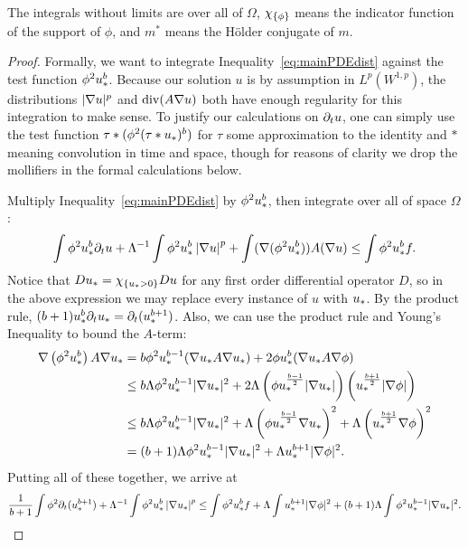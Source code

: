 \begin{lemma}
The integrals without limits are over all of $\Omega$, $\chi_{\{\phi\}}$ means the indicator function of the support of $\phi$, and $m^\ast$ means the H\"{o}lder conjugate of $m$.
\end{lemma}

\begin{proof}
Formally, we want to integrate Inequality~\eqref{eq:mainPDEdist} against the test function $\phi^2 u_*^b$.  Because our solution $u$ is by assumption in $L^p(W^{1,p})$, the distributions $|\nabla u|^p$ and $\operatorname{div}(A \nabla u)$ both have enough regularity for this integration to make sense.  To justify our calculations on $\partial_t u$, one can simply use the test function $\tau \ast (\phi^2 (\tau \ast u_*)^b)$ for $\tau$ some approximation to the identity and $\ast$ meaning convolution in time and space, though for reasons of clarity we drop the mollifiers in the formal calculations below.  

Multiply Inequality~\eqref{eq:mainPDEdist} by $\phi^2u_*^b$, then integrate over all of space $\Omega$:
\[\int \phi^2 u_*^b \partial_t u + \Lambda^{-1} \int \phi^2 u_*^b \left\lvert \nabla u \right\rvert^p + \int (\nabla (\phi^2 u_*^b))A (\nabla u) \leq \int \phi^2 u_*^b f. \] 
Notice that $Du_* = \chi_{\{u_* > 0\}} Du$ for any first order differential operator $D$, so in the above expression we may replace every instance of $u$ with $u_*$.  By the product rule, $(b+1) u_*^b \partial_t u_* = \partial_t(u_*^{b+1})$.  Also, we can use the product rule and Young's Inequality to bound the $A$-term:
\begin{align*}%
\grad\paren{\phi^2 \upl^b} A \grad \upl &= b \phi^2 \upl^{b-1} (\grad\upl A \grad\upl) + 2 \phi \upl^b (\grad \upl A \grad \phi)
\\ &\leq b \Lambda \phi^2 \upl^{b-1} |\grad \upl|^2 + 2 \Lambda \paren{ \phi \upl^\frac{b-1}{2}|\grad \upl|} \paren{ \upl^\frac{b+1}{2} |\grad \phi|} 
\\ &\leq  b \Lambda \phi^2 \upl^{b-1} |\grad \upl|^2 + \Lambda \paren{ \phi \upl^\frac{b-1}{2}\grad \upl}^2 + \Lambda \paren{ \upl^\frac{b+1}{2} \grad \phi}^2
\\ &= (b+1) \Lambda \phi^2 \upl^{b-1} |\grad \upl|^2 + \Lambda \upl^{b+1} |\grad \phi|^2.
\end{align*}
Putting all of these together, we arrive at
\[ \frac{1}{b+1} \int \phi^2 \partial_t(u_*^{b+1}) + \Lambda^{-1} \int \phi^2 u_*^b \left\lvert \nabla u_* \right\rvert^p \leq \int \phi^2 u_*^b f + \Lambda \int u_*^{b+1} |\nabla \phi|^2 + (b+1)\Lambda \int \phi^2 u_*^{b-1} |\nabla u_*|^2. \]


\end{proof}
